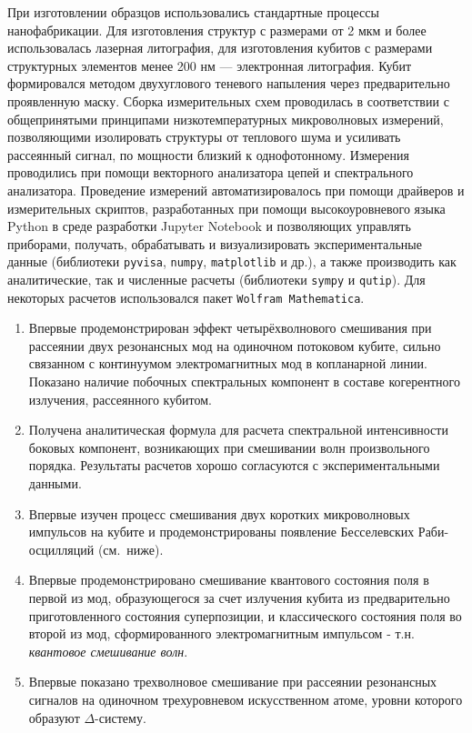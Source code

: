 {\methods} При изготовлении образцов использовались стандартные процессы нанофабрикации. Для изготовления структур с размерами от 2 мкм и более использовалась лазерная литография, для изготовления кубитов с размерами структурных элементов менее 200 нм --- электронная литография. Кубит формировался методом двухуглового теневого напыления через предварительно проявленную маску. Сборка измерительных схем проводилась в соответствии с общепринятыми принципами низкотемпературных микроволновых измерений, позволяющими изолировать структуры от теплового шума и усиливать рассеянный сигнал, по мощности близкий к однофотонному. Измерения проводились при помощи векторного анализатора цепей и спектрального анализатора. 
Проведение измерений автоматизировалось при помощи драйверов и измерительных скриптов, разработанных при помощи высокоуровневого языка Python в среде разработки Jupyter Notebook и позволяющих управлять приборами, получать, обрабатывать и визуализировать экспериментальные данные (библиотеки \verb|pyvisa|, \verb|numpy|, \verb|matplotlib| и др.), а также производить как аналитические, так и численные расчеты (библиотеки \verb|sympy| и \verb|qutip|). Для некоторых расчетов использовался пакет \verb|Wolfram Mathematica|.

{\novelty}
\begin{enumerate}
  \item Впервые продемонстрирован эффект четырёхволнового смешивания при рассеянии двух резонансных мод на одиночном потоковом кубите, сильно связанном с континуумом электромагнитных мод в копланарной линии. Показано наличие побочных спектральных компонент в составе когерентного излучения, рассеянного кубитом. 
  \item Получена аналитическая формула для расчета спектральной интенсивности боковых компонент, возникающих при смешивании волн произвольного порядка. Результаты расчетов хорошо согласуются с экспериментальными данными. 
  \item Впервые изучен процесс смешивания двух коротких микроволновых импульсов на кубите и продемонстрированы  появление Бесселевских Раби-осцилляций (см.~ниже).
  \item Впервые продемонстрировано смешивание квантового состояния поля в первой из мод, образующегося за счет излучения кубита из предварительно приготовленного состояния суперпозиции, и классического состояния поля во второй из мод, сформированного электромагнитным импульсом - т.н. \textit{квантовое смешивание волн}.
  \item Впервые показано трехволновое смешивание при рассеянии резонансных сигналов на одиночном трехуровневом искусственном атоме, уровни которого образуют $\Delta$-систему.
\end{enumerate}

